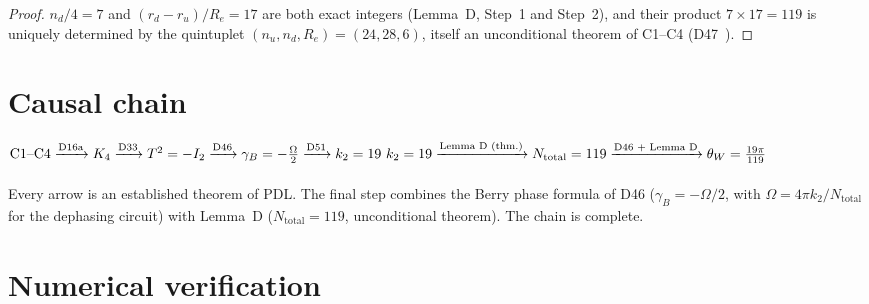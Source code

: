 \documentclass[12pt,a4paper]{article}
\theoremstyle{plain}
\theoremstyle{definition}
\theoremstyle{remark}
\newenvironment{chainbox}[1][]{%
  \begin{tcolorbox}[chainstyle,title={Causal Chain\ifx\relax#1\relax\else: #1\fi}]}{\end{tcolorbox}}
\newcommand{\PDL}{\textsc{PDL}}
\newcommand{\Kfour}{K_4}
\renewcommand{\Re}{R_e}
\newcommand{\ru}{r_u}
\newcommand{\rd}{r_d}
\newcommand{\thetaW}{\theta_W}
\newcommand{\Ntot}{N_{\mathrm{total}}}
\newcommand{\ktwo}{k_2}
\begin{document}
\begin{proof}
$n_d/4 = 7$ and $(\rd-\ru)/\Re = 17$ are both exact integers (Lemma~D, Step~1 and Step~2), and their product $7\times 17 = 119$ is uniquely determined by the quintuplet $(n_u, n_d, \Re) = (24, 28, 6)$, itself an unconditional theorem of C1--C4 (D47~\cite{PDL_D47}).
\end{proof}

\section{Causal chain}
\label{sec:chain}

\begin{chainbox}[Causal chain for $\thetaW$]
$
\mathrm{C1}\text{--}\mathrm{C4}
\xrightarrow{\text{D16a}} \Kfour
\xrightarrow{\text{D33}} T^2 = -I_2
\xrightarrow{\text{D46}} \gamma_B = -\tfrac{\Omega}{2}
\xrightarrow{\text{D51}} \ktwo = 19 
\\\\\
\ktwo = 19
\xrightarrow{\text{Lemma D (thm.)}} \Ntot = 119
\xrightarrow{\text{D46 + Lemma D}} \thetaW = \frac{19\pi}{119}
$
\\\\
Every arrow is an established theorem of \PDL. The final step combines the Berry phase formula of D46 ($\gamma_B = -\Omega/2$, with $\Omega = 4\pi\ktwo/\Ntot$ for the dephasing circuit) with Lemma~D ($\Ntot = 119$, unconditional theorem). The chain is complete.
\end{chainbox}

\section{Numerical verification}
\label{sec:numerical}
\end{document}
